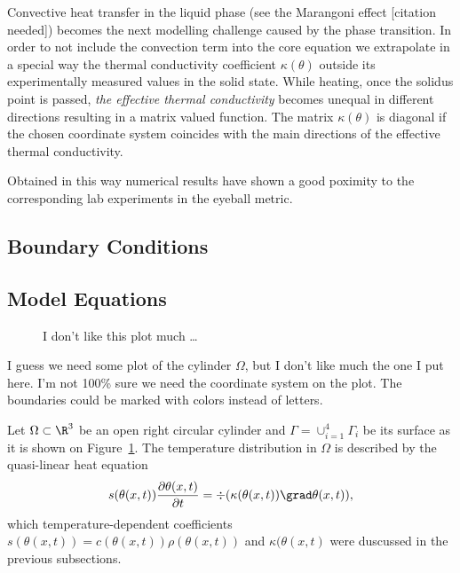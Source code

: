 Convective heat transfer in the liquid phase (see the Marangoni effect [citation needed]) becomes the next modelling challenge caused by the phase transition. In order to not include the convection term into the core equation we extrapolate in a special way the thermal conductivity coefficient $\kappa(\theta)$ outside its experimentally measured values in the solid state. While heating, once the solidus point is passed, \emph{the effective thermal conductivity} becomes unequal in different directions resulting in a matrix valued function. The matrix $\kappa(\theta)$ is diagonal if the chosen coordinate system coincides with the main directions of the effective thermal conductivity.

{\color{TolHighContrastBlue}
Obtained in this way numerical results have shown a good poximity to the corresponding lab experiments in the eyeball metric.
}



\subsection{Boundary Conditions}


\subsection{Model Equations}

\begin{figure}[ht]
	\centering
	
	\caption{I don't like this plot much \ldots}
	\label{fig:cylinder}
\end{figure}

{\color{TolHighContrastBlue}
I guess we need some plot of the cylinder $\Omega$, but I don't like much the one I put here. I'm not 100\% sure we need the coordinate system on the plot. The boundaries could be marked with colors instead of letters.
}

Let $\Omega	\subset \R^3$ be an open right circular cylinder and $\Gamma = \cup_{i=1}^4 \Gamma_i$ be its surface as it is shown on Figure~\ref{fig:cylinder}. The temperature distribution in $\Omega$ is described by the quasi-linear heat equation
\begin{equation} \label{eq:heat_eq}
	s(\theta(x,t)) \frac{\partial \theta(x,t)}{\partial t} = \div (\kappa(\theta(x,t)) \grad\theta(x,t)),
\end{equation}
which temperature-dependent coefficients $s(\theta(x,t)) = c(\theta(x,t)) \rho(\theta(x,t))$ and $\kappa(\theta(x,t)$ were duscussed in the previous subsections.

